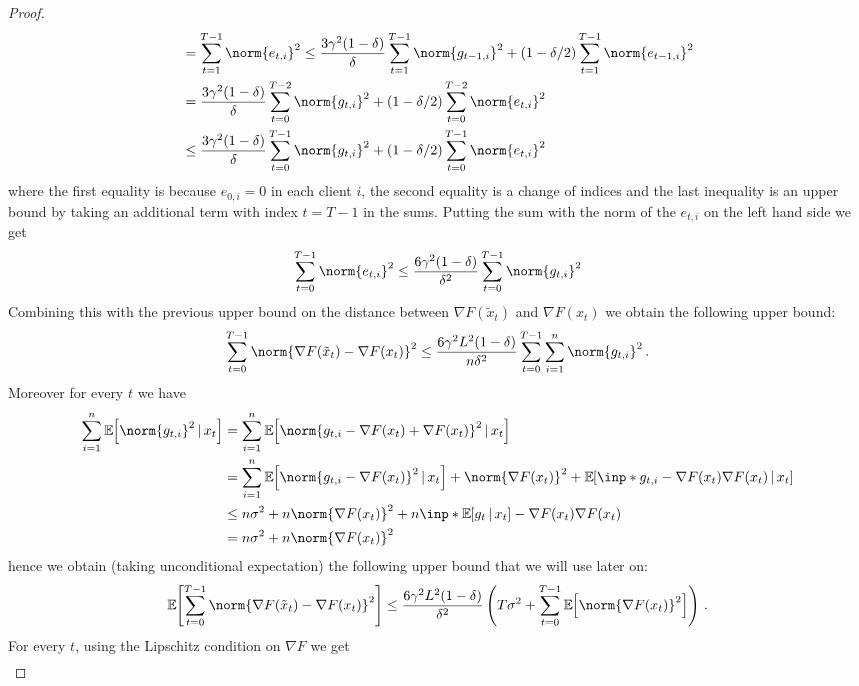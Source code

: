 \documentclass{article}
\begin{document}
\begin{proof}
\begin{align*}
     & =
    \sum_{t=1}^{T-1} \norm{e_{t,i}}^2
    \leq
    \frac{3 \gamma^2 (1-\delta)}{\delta} \sum_{t=1}^{T-1}  \norm{g_{t-1,i}}^2 + (1-\delta/2) \sum_{t=1}^{T-1}  \norm{e_{t-1,i}}^2
    \\
     & =
    \frac{3 \gamma^2 (1-\delta)}{\delta} \sum_{t=0}^{T-2}  \norm{g_{t,i}}^2 + (1-\delta/2) \sum_{t=0}^{T-2}  \norm{e_{t,i}}^2
    \\
     & \leq
    \frac{3 \gamma^2 (1-\delta)}{\delta} \sum_{t=0}^{T-1}  \norm{g_{t,i}}^2 + (1-\delta/2) \sum_{t=0}^{T-1}  \norm{e_{t,i}}^2
  \end{align*}
  where the first equality is because $e_{0,i} = 0$ in each client $i$, the second equality is a change of indices and the last inequality is an upper bound by taking an additional term with index $t = T-1$ in the sums. Putting the sum with the norm of the $e_{t,i}$ on the left hand side we get
  \[
    \sum_{t=0}^{T-1} \norm{e_{t,i}}^2
    \leq
    \frac{6 \gamma^2 (1-\delta)}{\delta^2} \sum_{t=0}^{T-1}  \norm{g_{t,i}}^2
  \]
  Combining this with the previous upper bound on the distance between $\nabla F(\tilde x_t)$ and $\nabla F(x_t)$ we obtain the following upper bound:
  \[
    \sum_{t=0}^{T-1} \norm{\nabla F(\tilde x_t) - \nabla F(x_t)}^2
    \leq
    \frac{6 \gamma^2 L^2 (1-\delta)}{n \delta^2} \sum_{t=0}^{T-1} \sum_{i=1}^n \norm{g_{t,i}}^2
    \, .
  \]
  Moreover for every $t$ we have
  \begin{align*}
    \sum_{i=1}^n \expec{\norm{g_{t,i}}^2 \,|\, x_t}
     & =
    \sum_{i=1}^n \expec{\norm{g_{t,i} - \nabla F(x_t) + \nabla F(x_t)}^2 \,|\, x_t}
    \\
     & =
    \sum_{i=1}^n \expec{\norm{g_{t,i} - \nabla F(x_t)}^2 \,|\, x_t} + \norm{\nabla F(x_t)}^2 + \expec{\inp*{g_{t,i} - \nabla F(x_t)}{\nabla F(x_t)} \,|\, x_t}
    \\
     & \leq
    n \sigma^2 + n \norm{\nabla F(x_t)}^2 + n \inp*{\expec{g_t  \,|\, x_t } - \nabla F(x_t)}{\nabla F(x_t)}
    \\
     & =
    n \sigma^2 + n \norm{\nabla F(x_t)}^2
  \end{align*}
  hence we obtain (taking unconditional expectation) the following upper bound that we will use later on:
  \[
    \expec{\sum_{t=0}^{T-1} \norm{\nabla F(\tilde x_t) - \nabla F(x_t)}^2}
    \leq
    \frac{6 \gamma^2 L^2 (1-\delta)}{\delta^2} \left( T \sigma^2 + \sum_{t=0}^{T-1} \expec{ \norm{\nabla F(x_t)}^2 } \right)
    \, .
  \]
  For every $t$, using the Lipschitz condition on $\nabla F$ we get
  \begin{align*}

\end{align*}
\end{proof}
\end{document}
